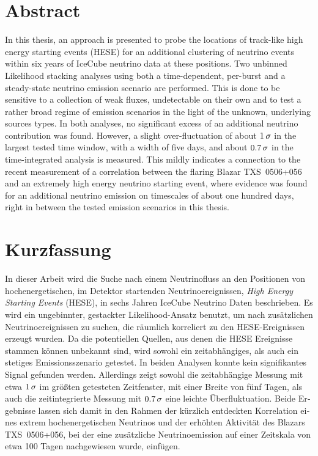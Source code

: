 \thispagestyle{plain}

\section*{Abstract}
In this thesis, an approach is presented to probe the locations of track-like high energy starting events (HESE) for an additional clustering of neutrino events within six years of IceCube neutrino data at these positions.
Two unbinned Likelihood stacking analyses using both a time-dependent, per-burst and a steady-state neutrino emission scenario are performed.
This is done to be sensitive to a collection of weak fluxes, undetectable on their own and to test a rather broad regime of emission scenarios in the light of the unknown, underlying sources types.
In both analyses, no significant excess of an additional neutrino contribution was found.
However, a slight over-fluctuation of about $\num{1}\,\sigma$ in the largest tested time window, with a width of five days, and about $\num{0.7}\,\sigma$ in the time-integrated analysis is measured.
This mildly indicates a connection to the recent measurement of a correlation between the flaring Blazar TXS~0506+056 and an extremely high energy neutrino starting event, where evidence was found for an additional neutrino emission on timescales of about one hundred days, right in between the tested emission scenarios in this thesis.

\section*{Kurzfassung}
\begin{german}
In dieser Arbeit wird die Suche nach einem Neutrinofluss an den Positionen von hochenergetischen, im Detektor startenden Neutrinoereignissen, \emph{High Energy Starting Events} (HESE), in sechs Jahren IceCube Neutrino Daten beschrieben.
Es wird ein ungebinnter, gestackter Likelihood-Ansatz benutzt, um nach zusätzlichen Neutrinoereignissen zu suchen, die räumlich korreliert zu den HESE-Ereignissen erzeugt wurden.
Da die potentiellen Quellen, aus denen die HESE Ereignisse stammen können unbekannt sind, wird sowohl ein zeitabhängiges, als auch ein stetiges Emissionsszenario getestet.
In beiden Analysen konnte kein signifikantes Signal gefunden werden.
Allerdings zeigt sowohl die zeitabhängige Messung mit etwa $\num{1}\,\sigma$ im größten getesteten Zeitfenster, mit einer Breite von fünf Tagen, als auch die zeitintegrierte Messung mit $\num{0.7}\,\sigma$ eine leichte Überfluktuation.
Beide Ergebnisse lassen sich damit in den Rahmen der kürzlich entdeckten Korrelation eines extrem hochenergetischen Neutrinos und der erhöhten Aktivität des Blazars TXS~0506+056, bei der eine zusätzliche Neutrinoemission auf einer Zeitskala von etwa 100 Tagen nachgewiesen wurde, einfügen.
\end{german}